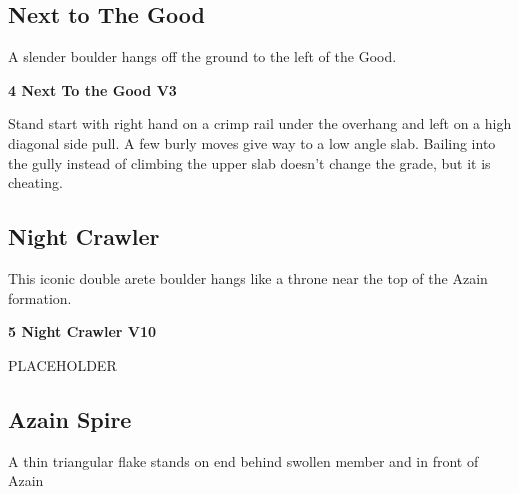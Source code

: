 \begin{multicols*}{2}
			\subsection*{Next to The Good}\label{bf:Next to The Good}
			\begin{minipage}{\columnwidth}
			A slender boulder hangs off the ground to the left of the Good.
			\end{minipage}
			
					\label{rt:Next To the Good}\colorbox{green!20}{\textbf{4 Next To the Good V3   \warn }}
					\begin{adjustwidth}{0.5cm}{}
					\begin{minipage}{\linewidth}					
					Stand start with right hand on a crimp rail under the overhang and left on a high diagonal side pull. A few burly moves give way to a low angle slab. Bailing into the gully instead of climbing the upper slab doesn't change the grade, but it is cheating.
					\end{minipage}
					\end{adjustwidth}
			\subsection*{Night Crawler}\label{bf:Night Crawler}
			\begin{minipage}{\columnwidth}
			This iconic double arete boulder hangs like a throne near the top of the Azain formation.
			\end{minipage}
			

					\label{rt:Night Crawler}\colorbox{red!20}{\textbf{5 Night Crawler V10  }}
					\begin{adjustwidth}{0.5cm}{}
					\begin{minipage}{\linewidth}					
					PLACEHOLDER
					\end{minipage}
					\end{adjustwidth}
			\subsection*{Azain Spire}\label{bf:Azain Spire}
			\begin{minipage}{\columnwidth}
			A thin triangular flake stands on end behind swollen member and in front of Azain
			\end{minipage}
			


\end{multicols*}
